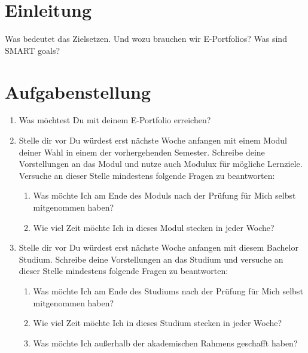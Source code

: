 \documentclass[a4paper,oneside]{scrarticle}
\begin{document}
	\section*{Einleitung}
	Was bedeutet das Zielsetzen. Und wozu brauchen wir E-Portfolios? Was sind SMART goals?
	
	\section*{Aufgabenstellung}

	\begin{enumerate}
		\item Was möchtest Du mit deinem E-Portfolio erreichen?
		\item Stelle dir vor Du würdest erst nächste Woche anfangen mit einem Modul deiner Wahl in einem der vorhergehenden Semester. Schreibe deine Vorstellungen an das Modul und nutze auch Modulux für mögliche Lernziele. Versuche an dieser Stelle mindestens folgende Fragen zu beantworten:
		\begin{enumerate}
			\item Was möchte Ich am Ende des Moduls nach der Prüfung für Mich selbst mitgenommen haben?
			\item Wie viel Zeit möchte Ich in dieses Modul stecken in jeder Woche?
		\end{enumerate}
		\item Stelle dir vor Du würdest erst nächste Woche anfangen mit diesem Bachelor Studium. Schreibe deine Vorstellungen an das Studium und versuche an dieser Stelle mindestens folgende Fragen zu beantworten:
		\begin{enumerate}
			\item Was möchte Ich am Ende des Studiums nach der Prüfung für Mich selbst mitgenommen haben?
			\item Wie viel Zeit möchte Ich in dieses Studium stecken in jeder Woche?
			\item Was möchte Ich außerhalb der akademischen Rahmens geschafft haben?
		\end{enumerate}

	\end{enumerate}
\end{document}
